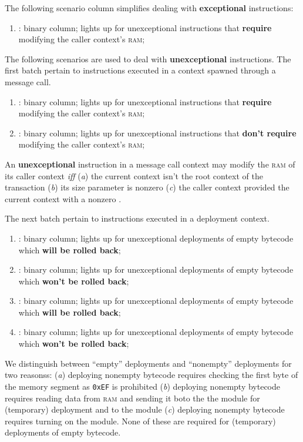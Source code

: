 The following scenario column simplifies dealing with \textbf{exceptional}  instructions: 
\begin{enumerate}[resume]
	\item \scenReturnException:
		binary column;
		lights up for unexceptional  instructions that \textbf{require} modifying the caller context's \textsc{ram};
\end{enumerate}
The following scenarios are used to deal with \textbf{unexceptional}  instructions.
The first batch pertain to  instructions executed in a context spawned through a message call.
\begin{enumerate}[resume]
	\item \scenReturnFromMessageCallWillTouchRam:
		binary column;
		lights up for unexceptional  instructions that \textbf{require} modifying the caller context's \textsc{ram};
	\item \scenReturnFromMessageCallWontTouchRam:
		binary column;
		lights up for unexceptional  instructions that \textbf{don't require} modifying the caller context's \textsc{ram};
\end{enumerate}
\saNote{} An \textbf{unexceptional}  instruction in a message call context may modify the \textsc{ram} of its caller context \emph{iff}
(\emph{a}) the current context isn't the root context of the transaction
(\emph{b}) its size parameter is nonzero
(\emph{c}) the caller context provided the current context with a nonzero \rac{}.

The next batch pertain to  instructions executed in a deployment context.
\begin{enumerate}[resume]
	\item \scenReturnFromDeploymentEmptyByteCodeWillRevert:
		binary column;
		lights up for unexceptional  deployments of empty bytecode which \textbf{will be rolled back};
	\item \scenReturnFromDeploymentEmptyByteCodeWontRevert:
		binary column;
		lights up for unexceptional  deployments of empty bytecode which \textbf{won't be rolled back};
	\item \scenReturnFromDeploymentNonemptyByteCodeWillRevert:
		binary column;
		lights up for unexceptional  deployments of empty bytecode which \textbf{will be rolled back};
	\item \scenReturnFromDeploymentNonemptyByteCodeWontRevert:
		binary column;
		lights up for unexceptional  deployments of empty bytecode which \textbf{won't be rolled back};
\end{enumerate}
\saNote{} We distinguish between ``empty'' deployments and ``nonempty'' deployments for two reasonss:
(\emph{a}) deploying nonempty bytecode requires checking the first byte of the memory segment as \texttt{0xEF} is prohibited
(\emph{b}) deploying nonempty bytecode requires reading data from \textsc{ram} and sending it boto the the \romMod{} module for (temporary) deployment and to the \hashDataMod{} module
(\emph{c}) deploying nonempty bytecode requires turning on the \hashInfoMod{} module.
None of these are required for (temporary) deployments of empty bytecode.
